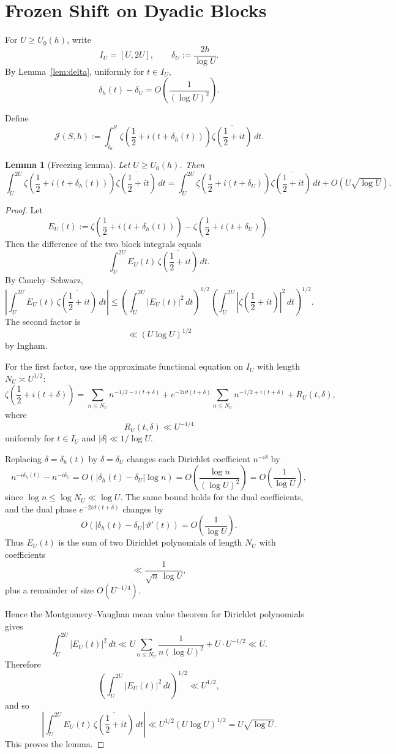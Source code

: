 \documentclass[11pt]{article}
\theoremstyle{plain}
\newtheorem{lemma}{Lemma}
\theoremstyle{definition}
\newcommand{\assign}{:=}
\begin{document}
\section{Frozen Shift on Dyadic Blocks}

For $U\ge U_0(h)$, write
\[
I_U=[U,2U],
\qquad
\delta_U\assign \frac{2h}{\log U}.
\]
By Lemma~\ref{lem:delta}, uniformly for $t\in I_U$,
\[
\delta_h(t)-\delta_U
=
O\!\left(\frac{1}{(\log U)^2}\right).
\]

Define
\[
\mathcal J(S,h)\assign
\int_{t_0}^{S}
\zeta\!\left(\frac12+i(t+\delta_h(t))\right)\overline{\zeta\!\left(\frac12+it\right)}
\,dt.
\]

\begin{lemma}[Freezing lemma]
\label{lem:freeze}
Let $U\ge U_0(h)$. Then
\[
\int_U^{2U}
\zeta\!\left(\frac12+i(t+\delta_h(t))\right)\overline{\zeta\!\left(\frac12+it\right)}
\,dt
=
\int_U^{2U}
\zeta\!\left(\frac12+i(t+\delta_U)\right)\overline{\zeta\!\left(\frac12+it\right)}
\,dt
+
O\!\left(U\sqrt{\log U}\right).
\]
\end{lemma}

\begin{proof}
Let
\[
E_U(t)\assign
\zeta\!\left(\frac12+i(t+\delta_h(t))\right)
-
\zeta\!\left(\frac12+i(t+\delta_U)\right).
\]
Then the difference of the two block integrals equals
\[
\int_U^{2U} E_U(t)\,\overline{\zeta\!\left(\frac12+it\right)}\,dt.
\]
By Cauchy--Schwarz,
\[
\left|
\int_U^{2U} E_U(t)\,\overline{\zeta\!\left(\frac12+it\right)}\,dt
\right|
\le
\left(\int_U^{2U}|E_U(t)|^2\,dt\right)^{1/2}
\left(\int_U^{2U}\left|\zeta\!\left(\frac12+it\right)\right|^2\,dt\right)^{1/2}.
\]
The second factor is
\[
\ll (U\log U)^{1/2}
\]
by Ingham.

For the first factor, use the approximate functional equation on $I_U$ with
length $N_U\asymp U^{1/2}$:
\[
\zeta\!\left(\frac12+i(t+\delta)\right)
=
\sum_{n\le N_U} n^{-1/2-i(t+\delta)}
+
e^{-2i\vartheta(t+\delta)}
\sum_{n\le N_U} n^{-1/2+i(t+\delta)}
+
R_U(t,\delta),
\]
where
\[
R_U(t,\delta)\ll U^{-1/4}
\]
uniformly for $t\in I_U$ and $|\delta|\ll 1/\log U$.

Replacing $\delta=\delta_h(t)$ by $\delta=\delta_U$ changes each Dirichlet
coefficient $n^{-i\delta}$ by
\[
n^{-i\delta_h(t)}-n^{-i\delta_U}
=
O\!\left(|\delta_h(t)-\delta_U|\log n\right)
=
O\!\left(\frac{\log n}{(\log U)^2}\right)
=
O\!\left(\frac{1}{\log U}\right),
\]
since $\log n\le \log N_U\ll \log U$.
The same bound holds for the dual coefficients, and the dual phase
$e^{-2i\vartheta(t+\delta)}$ changes by
\[
O\!\left(|\delta_h(t)-\delta_U|\,\vartheta'(t)\right)
=
O\!\left(\frac{1}{\log U}\right).
\]
Thus $E_U(t)$ is the sum of two Dirichlet polynomials of length $N_U$ with coefficients
\[
\ll \frac{1}{\sqrt n\,\log U},
\]
plus a remainder of size $O(U^{-1/4})$.

Hence the Montgomery--Vaughan mean value theorem for Dirichlet polynomials gives
\[
\int_U^{2U}|E_U(t)|^2\,dt
\ll
U\sum_{n\le N_U}\frac{1}{n(\log U)^2}
+
U\cdot U^{-1/2}
\ll
U.
\]
Therefore
\[
\left(\int_U^{2U}|E_U(t)|^2\,dt\right)^{1/2}\ll U^{1/2},
\]
and so
\[
\left|
\int_U^{2U} E_U(t)\,\overline{\zeta\!\left(\frac12+it\right)}\,dt
\right|
\ll
U^{1/2}(U\log U)^{1/2}
=
U\sqrt{\log U}.
\]
This proves the lemma.
\end{proof}
\end{document}
